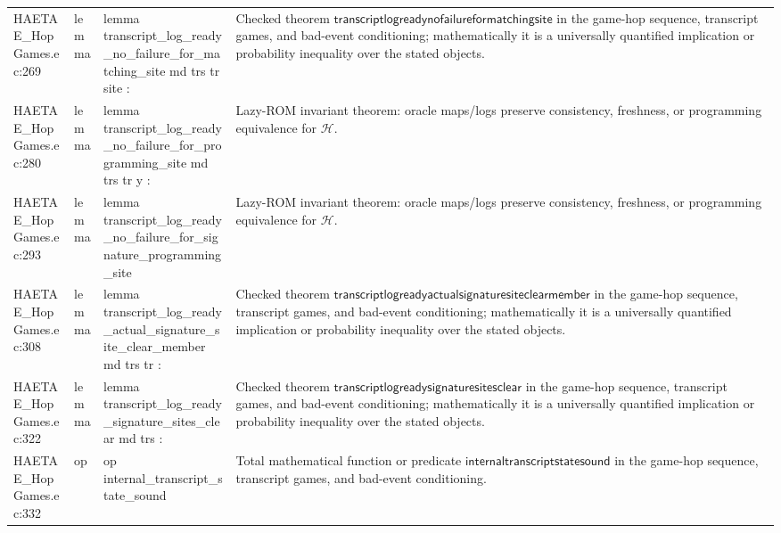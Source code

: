 \documentclass[10pt]{article}
\begin{document}
\begin{longtable}{L{0.11\textwidth}L{0.055\textwidth}L{0.385\textwidth}L{0.41\textwidth}}
HAETAE\_\allowbreak{}HopGames.\allowbreak{}ec:\allowbreak{}269 & lemma & {\ttfamily\scriptsize lemma transcript\_\allowbreak{}log\_\allowbreak{}ready\_\allowbreak{}no\_\allowbreak{}failure\_\allowbreak{}for\_\allowbreak{}matching\_\allowbreak{}site md trs tr site :} & Checked theorem $\mathsf{transcriptlogreadynofailureformatchingsite}$ in the game-hop sequence, transcript games, and bad-event conditioning; mathematically it is a universally quantified implication or probability inequality over the stated objects. \\
HAETAE\_\allowbreak{}HopGames.\allowbreak{}ec:\allowbreak{}280 & lemma & {\ttfamily\scriptsize lemma transcript\_\allowbreak{}log\_\allowbreak{}ready\_\allowbreak{}no\_\allowbreak{}failure\_\allowbreak{}for\_\allowbreak{}programming\_\allowbreak{}site md trs tr y :} & Lazy-ROM invariant theorem: oracle maps/logs preserve consistency, freshness, or programming equivalence for $\mathcal H$. \\
HAETAE\_\allowbreak{}HopGames.\allowbreak{}ec:\allowbreak{}293 & lemma & {\ttfamily\scriptsize lemma transcript\_\allowbreak{}log\_\allowbreak{}ready\_\allowbreak{}no\_\allowbreak{}failure\_\allowbreak{}for\_\allowbreak{}signature\_\allowbreak{}programming\_\allowbreak{}site} & Lazy-ROM invariant theorem: oracle maps/logs preserve consistency, freshness, or programming equivalence for $\mathcal H$. \\
HAETAE\_\allowbreak{}HopGames.\allowbreak{}ec:\allowbreak{}308 & lemma & {\ttfamily\scriptsize lemma transcript\_\allowbreak{}log\_\allowbreak{}ready\_\allowbreak{}actual\_\allowbreak{}signature\_\allowbreak{}site\_\allowbreak{}clear\_\allowbreak{}member md trs tr :} & Checked theorem $\mathsf{transcriptlogreadyactualsignaturesiteclearmember}$ in the game-hop sequence, transcript games, and bad-event conditioning; mathematically it is a universally quantified implication or probability inequality over the stated objects. \\
HAETAE\_\allowbreak{}HopGames.\allowbreak{}ec:\allowbreak{}322 & lemma & {\ttfamily\scriptsize lemma transcript\_\allowbreak{}log\_\allowbreak{}ready\_\allowbreak{}signature\_\allowbreak{}sites\_\allowbreak{}clear md trs :} & Checked theorem $\mathsf{transcriptlogreadysignaturesitesclear}$ in the game-hop sequence, transcript games, and bad-event conditioning; mathematically it is a universally quantified implication or probability inequality over the stated objects. \\
HAETAE\_\allowbreak{}HopGames.\allowbreak{}ec:\allowbreak{}332 & op & {\ttfamily\scriptsize op internal\_\allowbreak{}transcript\_\allowbreak{}state\_\allowbreak{}sound} & Total mathematical function or predicate $\mathsf{internaltranscriptstatesound}$ in the game-hop sequence, transcript games, and bad-event conditioning. \\

\end{longtable}
\end{document}
